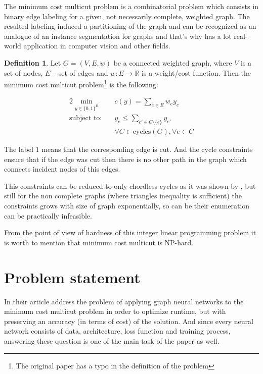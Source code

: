 \documentclass[10pt, twocolumn, a4paper]{article}
\theoremstyle{definition}
\newtheorem{definition}{Definition}
\begin{document}
The minimum cost multicut problem is a combinatorial problem which consists in binary
edge labeling for a given, not necessarily complete, weighted graph. The resulted labeling induced
a partitioning of the graph and can be recognized as an analogue of an instance segmentation for graphs and
that's why has a lot real-world application in computer vision and other fields.

\begin{definition}
    Let $G = (V, E, w)$ be a connected weighted graph, where $V$ is a set of nodes, $E$ -- set of edges and
    $w: E \to \mathbb{R}$ is a weight/cost function. Then the minimum cost multicut
    problem\footnote{The original paper has a typo in the definition of the problem}
    is the following:

    \begin{alignat}{2}
        \min_{y \in \{0, 1\}^E} \quad &
        c(y) = \sum\limits_{e \in E} w_e y_e                                                      \label{def:cost}                  \\
        \text{subject to:}      \quad &
        y_e \leq \sum\limits_{e' \in C \setminus \{e\}} y_{e'}                                         \label{def:cycle_constraint} \\
                                      & \forall C \in \text{cycles}(G), \forall e \in C \nonumber
    \end{alignat}
\end{definition}

The label $1$ means that the corresponding edge is cut.
And the cycle constraints ensure that if the edge was cut then there is no other path in the graph which connects
incident nodes of this edges.

This constraints can be reduced to only chordless cycles as it was shown by \citet{chopra1993partition}, but still for the
non complete graphs (where triangles inequality is sufficient) the constraints grows with size of graph exponentially, so can be
their enumeration can be practically infeasible.

From the point of view of hardness of this integer linear programming problem it is worth to mention that minimum cost multicut
is NP-hard.


\section{Problem statement}

In their article \citet{jung2022learning} address the problem of applying graph neural networks to
the minimum cost multicut problem in order to optimize runtime, but with preserving an
accuracy (in terms of cost) of the solution. And since every neural network consists of
data, architecture, loss function and training process, answering these question is one of the main
task of the paper as well.
\end{document}
